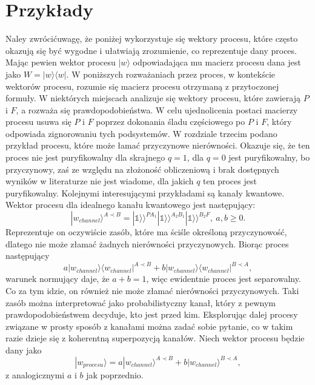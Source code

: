 \documentclass[10pt]{article} %
\newcommand{\Ket}[1]{|#1\rangle}
\newcommand{\Bra}[1]{\langle#1|}
\newcommand{\KKet}[1]{|#1\rangle\rangle}
\newcommand{\I}{\mathbb{1}}
\begin{document}
\section{Przykłady}
Naley zwrócićuwagę, że poniżej wykorzystuje się wektory procesu, które często okazują się być wygodne i ułatwiają zrozumienie, co reprezentuje dany proces.
Mając pewien wektor procesu $\Ket{w}$ odpowiadająca mu macierz procesu dana jest jako $W = \Ket{w}\Bra{w}$. W poniższych rozważaniach przez proces, w kontekście wektorów procesu, rozumie się macierz procesu otrzymaną z przytoczonej formuły. W niektórych miejscach analizuje się wektory procesu, które zawierają $P$ i $F$, a rozważa się prawdopodobieństwa. W celu ujednolicenia postaci macierzy procesu usuwa się $P$ i $F$ poprzez dokonania śladu częściowego po $P$ i $F$, który odpowiada zignorowaniu tych podsystemów.
W rozdziale trzecim podano przykład procesu, które może łamać przyczynowe nierówności. Okazuje się, że ten proces nie jest puryfikowalny dla skrajnego $q = 1$, dla $q=0$ jest puryfikowalny, bo przyczynowy, zaś ze względu na złożoność obliczeniową i brak dostępnych wyników w literaturze nie jest wiadome, dla jakich $q$ ten proces jest puryfikowalny.
Kolejnymi interesującymi przykładami są kanały kwantowe. Wektor procesu dla idealnego kanału kwantowego jest następujący:
\begin{equation}
\Ket{w_{channel}}^{A \prec B} = \KKet{\I}^{PA_1}\KKet{\I}^{A_2B_1}\KKet{\I}^{B_2F},~ a,b\geq0.
\end{equation}
Reprezentuje on oczywiście zasób, które ma ściśle określoną przyczynowość, dlatego nie może złamać żadnych nierówności przyczynowych.
Biorąc proces następujący
\begin{equation}
a\Ket{w_{channel}}\Bra{w_{channel}}^{A \prec B} + b\Ket{w_{channel}}\Bra{w_{channel}}^{B \prec A},
\end{equation} warunek normujący daje, że $a+b=1$, więc ewidentnie proces jest separowalny. Co za tym idzie, on również nie może złamać nierówności przyczynowych. Taki zasób można interpretować jako probabilistyczny kanał, który z pewnym prawdopodobieństwem decyduje, kto jest przed kim.
Eksplorując dalej procesy związane w prosty sposób z kanałami można zadać sobie pytanie, co w takim razie dzieje się z koherentną superpozycją kanałów. Niech wektor procesu będzie dany jako
\begin{equation}
\Ket{w_{procesu}} = a\Ket{w_{channel}}^{A \prec B} + b\Ket{w_{channel}}^{B \prec A},
\end{equation} z analogicznymi $a$ i $b$ jak poprzednio.
\end{document}
